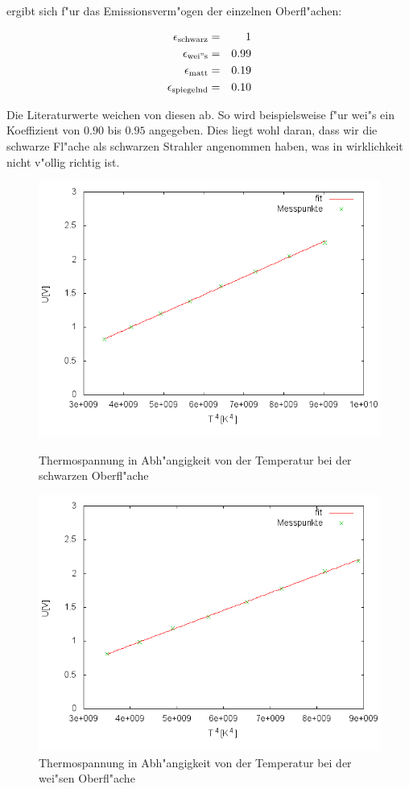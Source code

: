	ergibt sich f"ur das Emissionsverm"ogen der einzelnen Oberfl"achen:

	\begin{eqnarray*}
		\epsilon_\mathrm{schwarz} &=& 1\\
		\epsilon_\mathrm{wei"s} &=& 0.99\\
		\epsilon_\mathrm{matt} &=& 0.19\\
		\epsilon_\mathrm{spiegelnd} &=& 0.10
	\end{eqnarray*}

	Die Literaturwerte \cite{emission} weichen von diesen ab.
	So wird beispielsweise f"ur wei"s ein Ko\-ef\-fi\-zient von $0.90$ bis $0.95$ angegeben.
	Dies liegt wohl daran, dass wir die schwarze Fl"ache als schwarzen Strahler angenommen haben, was in wirklichkeit nicht v"ollig richtig ist.

	\begin{figure}[htbp]
		\centering
		\includegraphics[width = 12cm]{img/schwarz.png}
		\caption{Thermospannung in Abh"angigkeit von der Temperatur bei der schwarzen Oberfl"ache}
		\label{schwarz_graph}

		\centering
		\includegraphics[width = 12cm]{img/weiss.png}
		\caption{Thermospannung in Abh"angigkeit von der Temperatur bei der wei"sen Oberfl"ache}
		\label{weis_graph}
	\end{figure}

